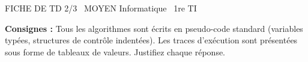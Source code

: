 \documentclass[11pt]{article}
\begin{document}
\begin{tcolorbox}[enhanced,colback=popink,colframe=popink,arc=10pt,boxrule=0pt,left=12pt,right=12pt,top=9pt,bottom=9pt]
{\color{white}\popxbold\small FICHE DE TD 2/3 \textbullet\ MOYEN \hfill Informatique \textbullet\ 1re TI\par}
\end{tcolorbox}
\vspace{4pt}
\noindent \textbf{Consignes :} Tous les algorithmes sont écrits en pseudo-code standard (variables typées, structures de contrôle indentées). Les traces d'exécution sont présentées sous forme de tableaux de valeurs. Justifiez chaque réponse.
\end{document}
